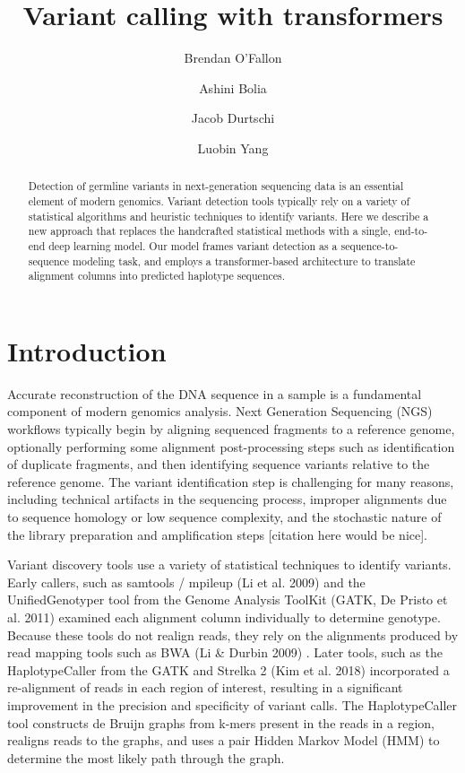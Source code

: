 \documentclass[]{article}
\title{Variant calling with transformers}
\author[1]{Brendan O'Fallon}
\author[1]{Ashini Bolia}
\author[1]{Jacob Durtschi}
\author[1]{Luobin Yang}
\affil[1]{ARUP Institute for Clinical and Experimental Pathology, Salt Lake City, UT}
\date{}
\begin{document}
\maketitle

\begin{abstract}
	Detection of germline variants in next-generation sequencing data is an essential element of modern genomics. Variant detection tools typically rely on a variety of statistical algorithms and heuristic techniques to identify variants. Here we describe a new approach that replaces the handcrafted statistical methods with a single, end-to-end deep learning model. Our model frames variant detection as a sequence-to-sequence modeling task, and employs a transformer-based architecture to translate alignment columns into predicted haplotype sequences. 
\end{abstract}

\section{Introduction}

Accurate reconstruction of the DNA sequence in a sample is a fundamental component of modern genomics analysis. Next Generation Sequencing (NGS) workflows typically begin by aligning sequenced fragments to a reference genome, optionally performing some alignment post-processing steps such as identification of duplicate fragments, and then identifying sequence variants relative to the reference genome. The variant identification step is challenging for many reasons, including technical artifacts in the sequencing process, improper alignments due to sequence homology or low sequence complexity, and the stochastic nature of the library preparation and amplification steps [citation here would be nice]. 


Variant discovery tools use a variety of statistical techniques to identify variants. Early callers, such as samtools / mpileup (Li et al. 2009) and the UnifiedGenotyper tool from the Genome Analysis ToolKit (GATK, De Pristo et al. 2011) examined each alignment column individually to determine genotype. Because these tools do not realign reads, they rely on the alignments produced by read mapping tools such as BWA (Li \& Durbin 2009) . Later tools, such as the HaplotypeCaller from the GATK and Strelka 2 (Kim et al. 2018) incorporated a re-alignment of reads in each region of interest, resulting in a significant improvement in the precision and specificity of variant calls. The HaplotypeCaller tool constructs de Bruijn graphs from k-mers present in the reads in a region, realigns reads to the graphs, and uses a pair Hidden Markov Model (HMM) to determine the most likely path through the graph. 
\end{document}
